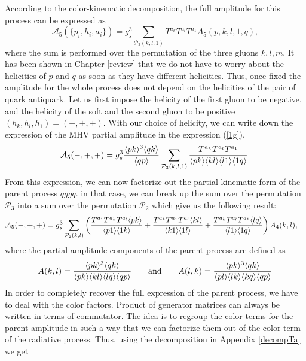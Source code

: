 \noindent According to the color-kinematic decomposition, the full amplitude for this process can be expressed as
\begin{equation}
\mathcal{A}_5(\{p_i,h_i,a_i\})=g^3_s\sum_{\mathcal{P}_3(k,l,1)} T^{a_k}T^{a_l}T^{a_1} A_5(p,k,l,1,q),
\label{1g}
\end{equation}
where the sum is performed over the permutation of the three gluons $k,l,m$. It has been shown in Chapter \ref{review} that we do not have to worry about the helicities of $p$ and $q$ as soon as they have different helicities. Thus, once fixed the amplitude for the whole process does not depend on the helicities of the pair of quark antiquark. Let us first impose the helicity of the first gluon to be negative, and the helicity of the soft and the second gluon to be positive $(h_k,h_l,h_1)=(-,+,+)$. With our choice of helicity, we can write down the expression of the MHV partial amplitude in the expression (\ref{1g}),
\begin{equation}
\mathcal{A}_5(-,+,+)=g^3_s \frac{\langle pk\rangle^3\langle qk\rangle}{\langle qp\rangle}  \sum_{\mathcal{P}_3(k,l,1)} \frac{T^{a_k}T^{a_l}T^{a_1}}{\langle pk\rangle \langle kl\rangle \langle l1\rangle \langle1q\rangle}. 
\end{equation}
From this expression, we can now factorize out the partial kinematic form of the parent process $qgg\bar{q}$. in that case, we can break up the sum over the permutation $\mathcal{P}_3$ into a sum over the permutation $\mathcal{P}_2$ which give us the following result:
\begin{align}
\mathcal{A}_5(-,+,+)=g^3_s \sum_{\mathcal{P}_2(k,l)} & \left( \frac{T^{a_1}T^{a_k}T^{a_l} \langle pk\rangle}{\langle p1\rangle \langle1k\rangle}+\frac{T^{a_k}T^{a_1}T^{a_l} \langle kl\rangle}{\langle k1\rangle \langle1l\rangle}+\frac{T^{a_k}T^{a_l}T^{a_1} \langle lq\rangle}{\langle l1\rangle \langle1q\rangle} \right)A_4(k,l),
\end{align}
where the partial amplitude components of the parent process are defined as
\begin{equation}
A(k,l)=\frac{\langle pk\rangle^3\langle qk\rangle}{\langle pk\rangle\langle kl\rangle\langle lq\rangle\langle qp\rangle} \qquad \text{and} \qquad A(l,k)=\frac{\langle pk\rangle^3\langle qk\rangle}{\langle pl\rangle\langle lk\rangle\langle kq\rangle\langle qp\rangle}
\end{equation}
In order to completely recover the full expression of the parent process, we have to deal with the color factors. Product of generator matrices can always be written in terms of commutator. The idea is to regroup the color terms for the parent amplitude in such a way that we can factorize them out of the color term of the radiative process. Thus, using the decomposition in Appendix \ref{decompTa} we get 
